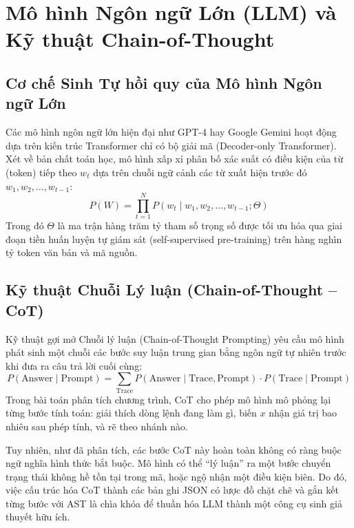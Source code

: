 \section{Mô hình Ngôn ngữ Lớn (LLM) và Kỹ thuật Chain-of-Thought}
\label{sec:llm_and_cot}

\subsection{Cơ chế Sinh Tự hồi quy của Mô hình Ngôn ngữ Lớn}
Các mô hình ngôn ngữ lớn hiện đại như GPT-4 hay Google Gemini hoạt động dựa trên kiến trúc Transformer chỉ có bộ giải mã (Decoder-only Transformer). Xét về bản chất toán học, mô hình xấp xỉ phân bố xác suất có điều kiện của từ (token) tiếp theo $w_t$ dựa trên chuỗi ngữ cảnh các từ xuất hiện trước đó $w_1, w_2, \dots, w_{t-1}$:
\begin{equation}
P(W) = \prod_{t=1}^{N} P(w_t \mid w_1, w_2, \dots, w_{t-1}; \Theta)
\end{equation}
Trong đó $\Theta$ là ma trận hàng trăm tỷ tham số trọng số được tối ưu hóa qua giai đoạn tiền huấn luyện tự giám sát (self-supervised pre-training) trên hàng nghìn tỷ token văn bản và mã nguồn.

\subsection{Kỹ thuật Chuỗi Lý luận (Chain-of-Thought -- CoT)}
Kỹ thuật gợi mở Chuỗi lý luận (Chain-of-Thought Prompting) \cite{wei2022chain} yêu cầu mô hình phát sinh một chuỗi các bước suy luận trung gian bằng ngôn ngữ tự nhiên trước khi đưa ra câu trả lời cuối cùng:
\begin{equation}
P(\text{Answer} \mid \text{Prompt}) = \sum_{\text{Trace}} P(\text{Answer} \mid \text{Trace}, \text{Prompt}) \cdot P(\text{Trace} \mid \text{Prompt})
\end{equation}
Trong bài toán phân tích chương trình, CoT cho phép mô hình mô phỏng lại từng bước tính toán: giải thích dòng lệnh đang làm gì, biến $x$ nhận giá trị bao nhiêu sau phép tính, và rẽ theo nhánh nào.

Tuy nhiên, như đã phân tích, các bước CoT này hoàn toàn không có ràng buộc ngữ nghĩa hình thức bắt buộc. Mô hình có thể ``lý luận'' ra một bước chuyển trạng thái không hề tồn tại trong mã, hoặc ngộ nhận một điều kiện biên. Do đó, việc cấu trúc hóa CoT thành các bản ghi JSON có lược đồ chặt chẽ và gắn kết từng bước với AST là chìa khóa để thuần hóa LLM thành một công cụ sinh giả thuyết hữu ích.

